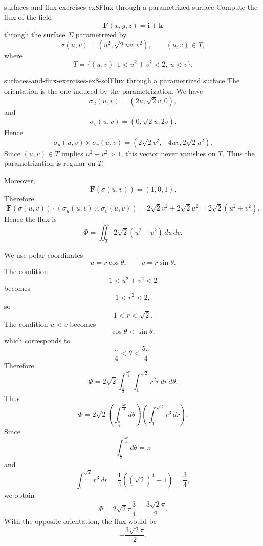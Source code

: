 \documentclass[preview]{standalone}
\begin{document}
\begin{snippetexercise}{surfaces-and-flux-exercises-ex8}{Flux through a parametrized surface}
    Compute the flux of the field \[\mathbf{F}(x,y,z)=\mathbf{i}+\mathbf{k}\] through the surface \(\Sigma\) parametrized by \[\sigma(u,v)=\left(u^2,\sqrt{2}uv,v^2\right),\qquad (u,v)\in T,\] where \[T=\{(u,v):1<u^2+v^2<2,\ u<v\}.\]
\end{snippetexercise}

\begin{snippetsolution}{surfaces-and-flux-exercises-ex8-sol}{Flux through a parametrized surface}
    The orientation is the one induced by the parametrization. We have
    \[
        \sigma_u(u,v)
        =
        (2u,\sqrt{2}v,0),
    \]
    and
    \[
        \sigma_v(u,v)
        =
        (0,\sqrt{2}u,2v).
    \]
    Hence
    \[
        \sigma_u(u,v)\times\sigma_v(u,v)
        =
        (2\sqrt{2}v^2,-4uv,2\sqrt{2}u^2).
    \]
    Since \((u,v)\in T\) implies \(u^2+v^2>1\), this vector never vanishes on \(T\). Thus the parametrization is regular on \(T\).

    Moreover,
    \[
        \mathbf{F}(\sigma(u,v))
        =
        (1,0,1).
    \]
    Therefore
    \[
        \mathbf{F}(\sigma(u,v))\cdot
        \left(\sigma_u(u,v)\times\sigma_v(u,v)\right)
        =
        2\sqrt{2}v^2+2\sqrt{2}u^2
        =
        2\sqrt{2}(u^2+v^2).
    \]
    Hence the flux is
    \[
        \Phi
        =
        \iint_T 2\sqrt{2}(u^2+v^2)\,du\,dv.
    \]

    We use polar coordinates
    \[
        u=r\cos\theta,\qquad v=r\sin\theta.
    \]
    The condition
    \[
        1<u^2+v^2<2
    \]
    becomes
    \[
        1<r^2<2,
    \]
    so
    \[
        1<r<\sqrt{2}.
    \]
    The condition \(u<v\) becomes
    \[
        \cos\theta<\sin\theta,
    \]
    which corresponds to
    \[
        \frac{\pi}{4}<\theta<\frac{5\pi}{4}.
    \]
    Therefore
    \[
        \Phi
        =
        2\sqrt{2}
        \int_{\frac{\pi}{4}}^{\frac{5\pi}{4}}
        \int_1^{\sqrt{2}}
        r^2r\,dr\,d\theta.
    \]
    Thus
    \[
        \Phi
        =
        2\sqrt{2}
        \left(\int_{\frac{\pi}{4}}^{\frac{5\pi}{4}}d\theta\right)
        \left(\int_1^{\sqrt{2}}r^3\,dr\right).
    \]
    Since
    \[
        \int_{\frac{\pi}{4}}^{\frac{5\pi}{4}}d\theta=\pi
    \]
    and
    \[
        \int_1^{\sqrt{2}}r^3\,dr
        =
        \frac{1}{4}\left((\sqrt{2})^4-1\right)
        =
        \frac{3}{4},
    \]
    we obtain
    \[
        \Phi
        =
        2\sqrt{2}\pi\frac{3}{4}
        =
        \frac{3\sqrt{2}\pi}{2}.
    \]
    With the opposite orientation, the flux would be
    \[
        -\frac{3\sqrt{2}\pi}{2}.
    \]
\end{snippetsolution}
\end{document}
